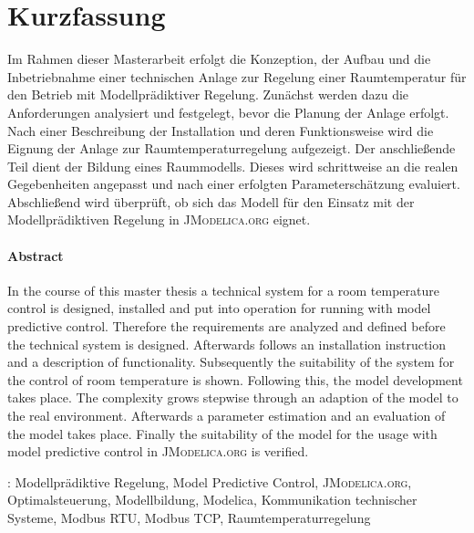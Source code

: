 %
%

\chapter*{Kurzfassung}
\thispagestyle{empty}
Im Rahmen dieser Masterarbeit erfolgt die Konzeption, der Aufbau und die Inbetriebnahme einer technischen Anlage zur Regelung einer Raumtemperatur für den Betrieb mit Modellprädiktiver Regelung. Zunächst werden dazu die Anforderungen analysiert und festgelegt, bevor die Planung der Anlage erfolgt. Nach einer Beschreibung der Installation und deren Funktionsweise wird die Eignung der Anlage zur Raumtemperaturregelung aufgezeigt. Der anschließende Teil dient der Bildung eines Raummodells. Dieses wird schrittweise an die realen Gegebenheiten angepasst und nach einer erfolgten Parameterschätzung evaluiert. Abschließend wird überprüft, ob sich das Modell für den Einsatz mit der Modellprädiktiven Regelung in \textsc{JModelica.org} eignet.

\subsubsection*{Abstract}
In the course of this master thesis a technical system for a room temperature control is designed, installed and put into operation for running with model predictive control. Therefore the requirements are analyzed and defined before the technical system is designed. Afterwards follows an installation instruction and a description of functionality. Subsequently the suitability of the system for the control of room temperature is shown. Following this, the model development takes place. The complexity grows stepwise through an adaption of the model to the real environment. Afterwards a parameter estimation and an evaluation of the model takes place. Finally the suitability of the model for the usage with model predictive control in \textsc{JModelica.org} is verified.\vspace{8\baselineskip}

{\normalsize
{}:  Modellprädiktive Regelung, Model Predictive Control, \textsc{JModelica.org}, Optimalsteuerung, Modellbildung, Modelica, Kommunikation technischer Systeme, Modbus RTU, Modbus TCP, Raumtemperaturregelung
}

